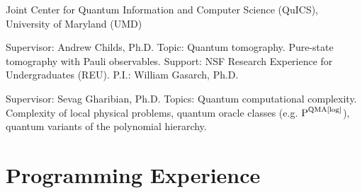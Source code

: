 \documentclass[11pt,letterpaper,serif]{moderncv}
\begin{document}
{
	$\!$\begin{minipage}{0.8\textwidth}
		Joint Center for Quantum Information and Computer Science (QuICS), \newline
		University of Maryland (UMD)	
	\end{minipage}
}
{}{}
{	
	\begin{adjustwidth}{.25in}{}
		Supervisor: Andrew Childs, Ph.D. \newline
		Topic: Quantum tomography. Pure-state tomography with Pauli observables. \newline
		Support: NSF Research Experience for Undergraduates (REU). P.I.: William Gasarch, Ph.D.
	\end{adjustwidth}
}

{
	\begin{adjustwidth}{.25in}{}
		Supervisor: Sevag Gharibian, Ph.D. \newline
		Topics: Quantum computational complexity. Complexity of local physical problems, quantum oracle classes (e.g. $\textup{P}^{\textup{QMA[log]}}$), quantum variants of the polynomial hierarchy.
	\end{adjustwidth}
}

\printbibliography[heading=subbibliography, title={Preprints}, keyword=preprint]

\printbibliography[heading=subbibliography, title={Conference presentations}, keyword=conference]

\printbibliography[heading=subbibliography, title={Department seminars}, keyword=seminar]

\printbibliography[heading=subbibliography, title={Public-audience talks}, keyword=public]


\section{Programming Experience}
\end{document}
